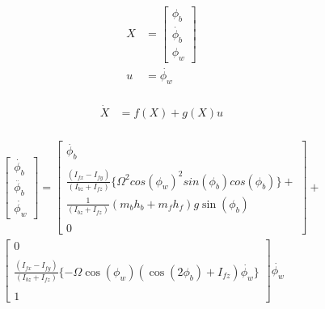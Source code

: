 \documentclass[journal, onecolumn]{IEEEtran} %
\begin{document}
\begin{eqnarray}
    \begin{aligned}
        X &= 
        \begin{bmatrix}
            \phi_b \\
            \dot{\phi_b} \\
            \phi_w
        \end{bmatrix} \\ 
        u &= \dot{\phi_w}
    \end{aligned}
\end{eqnarray}

\begin{eqnarray}
    \begin{aligned}
        \dot{X} &= f(X) + g(X) u
    \end{aligned}
\end{eqnarray}


\begin{eqnarray}
    \begin{aligned}
        \begin{bmatrix}
            \dot{\phi_b} \\
            \ddot{\phi_b} \\
            \dot{\phi_w}
        \end{bmatrix} 
        =         
        \begin{bmatrix}
            \dot{\phi_b} \\ \\

            \frac{ (I_{fx} - I_{fy}) }{(I_{bz} + I_{fz})} 
            \{ {\Omega}^2 {cos(\phi_w)}^2 sin(\phi_b) cos(\phi_b) \} + \\
            \frac{ 1 }{(I_{bz} + I_{fz})} (m_b h_b + m_f h_f) g \sin(\phi_b) \\ \\

            0
        \end{bmatrix}
        + \\
        \begin{bmatrix}
            0 \\ \\

            \frac{ (I_{fx} - I_{fy}) }{(I_{bz} + I_{fz})} 
            \{ -\Omega \cos(\phi_w)(\cos(2\phi_b) + I_{fz})\dot{\phi_w} \} \\ \\
            
            1
        \end{bmatrix}
        \dot{\phi_w}
    \end{aligned}
\end{eqnarray}
\end{document}
